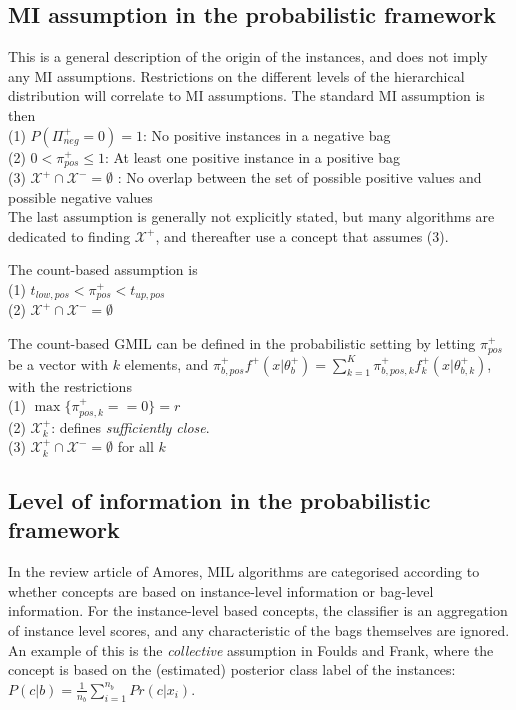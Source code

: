 \subsection{MI assumption in the probabilistic framework}
This is a general description of the origin of the instances, and does not imply any MI assumptions. 
Restrictions on the different levels of the hierarchical distribution will correlate to MI assumptions.
The standard MI assumption is then \\
(1) $P(\Pi^+_{neg} = 0) = 1$: No positive instances in a negative bag\\
(2) $0<\pi^+_{pos} \leq 1$: At least one positive instance in a positive bag\\
(3) $\mathcal{X}^+ \cap \mathcal{X}^- = \emptyset$ : No overlap between the set of possible positive values and possible negative values \\
The last assumption is generally not explicitly stated, but many algorithms are dedicated to finding $\mathcal{X}^+$, and thereafter use a concept that assumes (3). 

The count-based assumption is\\
(1) $t_{low,pos} < \pi^+_{pos} < t_{up,pos}$ \\
(2) $\mathcal{X}^+ \cap \mathcal{X}^- = \emptyset$ 

The count-based GMIL can be defined in the probabilistic setting by letting $\pi^+_{pos}$ be a vector with $k$ elements, and $\pi^+_{b,pos} f^+(x|\theta_b^+) = \sum_{k = 1}^K \pi^+_{b,pos,k} f^+_k(x|\theta_{b,k}^+)$, with the restrictions\\
(1) $\max \{\pi^+_{pos,k} == 0\} = r$ \\
(2) $\mathcal{X}^+_k$: defines {\it sufficiently close}. \\
(3) $\mathcal{X}^+_k \cap \mathcal{X}^- = \emptyset$ for all $k$ 

\subsection{Level of information in the probabilistic framework}
In the review article of Amores, MIL algorithms are categorised according to whether concepts are based on instance-level information or bag-level information. 
For the instance-level based concepts, the classifier is an aggregation of instance level scores, and any characteristic of the bags themselves are ignored. 
An example of this is the {\it collective} assumption in Foulds and Frank, where the concept is based on the (estimated) posterior class label of the instances: $P(c|b) = \frac{1}{n_b} \sum_{i = 1}^{n_b} Pr(c|x_i)$. 

